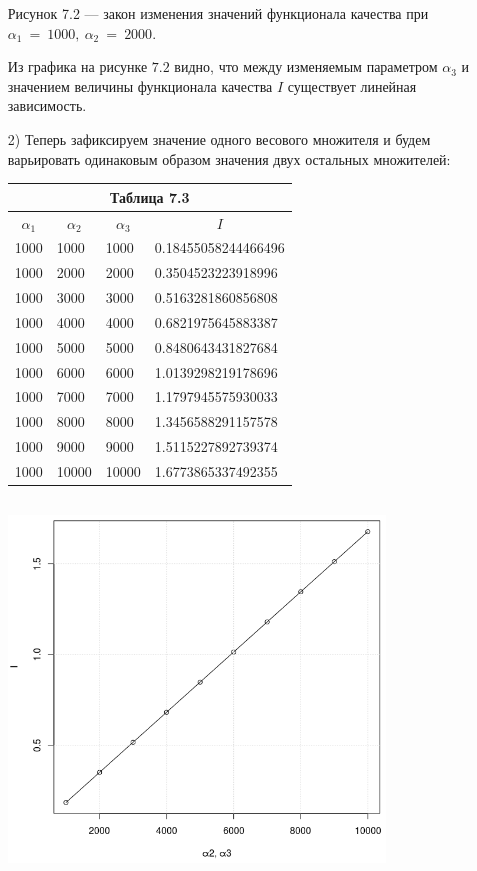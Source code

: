 \documentclass[14pt]{extreport}
\begin{document}
\begin{itemize}
\begin{center}
Рисунок 7.2 --- закон изменения значений функционала качества при $\alpha_1\ =\ 1000,\ \alpha_2\ =\ 2000$. 
\end{center}

Из графика на рисунке $7.2$ видно, что между изменяемым параметром $\alpha_3$ и значением величины функционала качества $I$
существует линейная зависимость.


\item[2)] Теперь зафиксируем значение одного весового множителя и будем варьировать одинаковым образом значения двух остальных множителей:

\begin{center}
   \begin{tabular}{ |l|l|l|l| }
   \multicolumn{4}{c}{Таблица 7.3}\\
    \hline
    \multicolumn{1}{|c|}{$\alpha_1$} & \multicolumn{1}{c|}{$\alpha_2$} & \multicolumn{1}{c|}{$\alpha_3$} & \multicolumn{1}{c|}{$I$} \\ \hline
    1000 & 1000 & 1000 & 0.18455058244466496   \\ \hline
    1000 & 2000 & 2000 & 0.3504523223918996  \\ \hline
    1000 & 3000 & 3000 & 0.5163281860856808  \\ \hline
    1000 & 4000 & 4000 & 0.6821975645883387  \\ \hline
    1000 & 5000 & 5000 & 0.8480643431827684  \\ \hline
    1000 & 6000 & 6000 & 1.0139298219178696  \\ \hline
    1000 & 7000 & 7000 & 1.1797945575930033  \\ \hline
    1000 & 8000 & 8000 & 1.3456588291157578  \\ \hline
    1000 & 9000 & 9000 & 1.5115227892739374  \\ \hline
    1000 & 10000 & 10000 &  1.6773865337492355 \\ \hline
  \end{tabular}             
\end{center}

\begin{center}
\includegraphics[width=10cm, height=10cm]{laa2.png}


\end{center}
\end{itemize}
\end{document}

